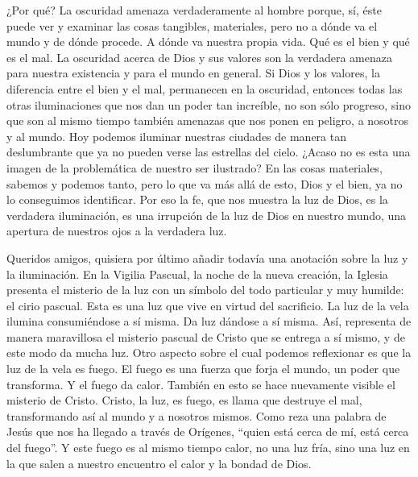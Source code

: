 			\begin{body}¿Por qué? La oscuridad amenaza verdaderamente al hombre porque, sí, éste puede ver y examinar las cosas tangibles, materiales, pero no a dónde va el mundo y de dónde procede. A dónde va nuestra propia vida. Qué es el bien y qué es el mal. La oscuridad acerca de Dios y sus valores son la verdadera amenaza para nuestra existencia y para el mundo en general. Si Dios y los valores, la diferencia entre el bien y el mal, permanecen en la oscuridad, entonces todas las otras iluminaciones que nos dan un poder tan increíble, no son sólo progreso, sino que son al mismo tiempo también amenazas que nos ponen en peligro, a nosotros y al mundo. Hoy podemos iluminar nuestras ciudades de manera tan deslumbrante que ya no pueden verse las estrellas del cielo. ¿Acaso no es esta una imagen de la problemática de nuestro ser ilustrado? En las cosas materiales, sabemos y podemos tanto, pero lo que va más allá de esto, Dios y el bien, ya no lo conseguimos identificar. Por eso la fe, que nos muestra la luz de Dios, es la verdadera iluminación, es una irrupción de la luz de Dios en nuestro mundo, una apertura de nuestros ojos a la verdadera luz.\end{body}
			
			\begin{body}Queridos amigos, quisiera por último añadir todavía una anotación sobre la luz y la iluminación. En la Vigilia Pascual, la noche de la nueva creación, la Iglesia presenta el misterio de la luz con un símbolo del todo particular y muy humilde: el cirio pascual. Esta es una luz que vive en virtud del sacrificio. La luz de la vela ilumina consumiéndose a sí misma. Da luz dándose a sí misma. Así, representa de manera maravillosa el misterio pascual de Cristo que se entrega a sí mismo, y de este modo da mucha luz. Otro aspecto sobre el cual podemos reflexionar es que la luz de la vela es fuego. El fuego es una fuerza que forja el mundo, un poder que transforma. Y el fuego da calor. También en esto se hace nuevamente visible el misterio de Cristo. Cristo, la luz, es fuego, es llama que destruye el mal, transformando así al mundo y a nosotros mismos. Como reza una palabra de Jesús que nos ha llegado a través de Orígenes, “quien está cerca de mí, está cerca del fuego”. Y este fuego es al mismo tiempo calor, no una luz fría, sino una luz en la que salen a nuestro encuentro el calor y la bondad de Dios.\end{body}
			
